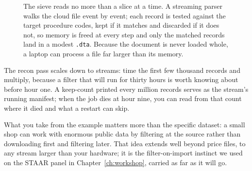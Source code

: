 \documentclass[
    a4paper,
    fontsize=10pt,
    twoside=true,
    numbers=noenddot,
]{kaobook}
\begin{document}
\begin{figure}[htbp]
\centering
{}
\caption[The streaming sieve]{The sieve reads no more than a slice at a time.
A streaming parser walks the cloud file event by event; each record is
tested against the target procedure codes, kept if it matches and
discarded if it does not, so memory is freed at every step and only the
matched records land in a modest \texttt{.dta}. Because the document is
never loaded whole, a laptop can process a file far larger than its
memory.}
\label{fig:ch04-viz-sieve}
\end{figure}

The recon pass scales down to streams: time the first few thousand records and multiply, because a filter that will run for thirty hours is worth knowing about before hour one. A keep-count printed every million records serves as the stream's running manifest; when the job dies at hour nine, you can read from that count where it died and what a restart can skip.

What you take from the example matters more than the specific dataset: a small shop can work with enormous public data by filtering at the source rather than downloading first and filtering later. That idea extends well beyond price files, to any stream larger than your hardware; it is the filter-on-import instinct we used on the STAAR panel in Chapter~\ref{ch:workshop}, carried as far as it will go.
\end{document}
